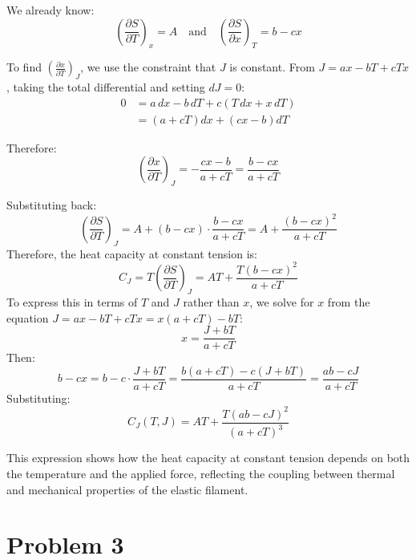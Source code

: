 \documentclass[10pt,twocoloumn]{article}
\begin{document}
We already know:
\begin{equation}\left(\frac{\partial S}{\partial T}\right)_x = A \quad \text{and} \quad \left(\frac{\partial S}{\partial x}\right)_T = b - cx
    \end{equation}

To find $\left(\frac{\partial x}{\partial T}\right)_J$, we use the constraint that $J$ is constant. From $J = ax - bT + cTx$, taking the total differential and setting $dJ = 0$:
\begin{align} 0 &= a\,dx - b\,dT + c(T\,dx + x\,dT) \\
&= (a + cT)dx + (cx - b)dT\end{align}

Therefore:
\begin{equation}
    \left(\frac{\partial x}{\partial T}\right)_J = -\frac{cx - b}{a + cT} = \frac{b - cx}{a + cT}
    \end{equation}

Substituting back:
\begin{equation}
    \left(\frac{\partial S}{\partial T}\right)_J = A + (b - cx) \cdot \frac{b - cx}{a + cT} = A + \frac{(b - cx)^2}{a + cT}
    \end{equation}
Therefore, the heat capacity at constant tension is:
\begin{equation}
    C_J = T\left(\frac{\partial S}{\partial T}\right)_J = AT + \frac{T(b - cx)^2}{a + cT}
    \end{equation}
To express this in terms of $T$ and $J$ rather than $x$, we solve for $x$ from the equation $J = ax - bT + cTx = x(a + cT) - bT$:
\begin{equation}
    x = \frac{J + bT}{a + cT}
    \end{equation}
Then:
\begin{equation}
    b - cx = b - c\cdot\frac{J + bT}{a + cT} = \frac{b(a + cT) - c(J + bT)}{a + cT} = \frac{ab - cJ}{a + cT}
    \end{equation}
Substituting:
\begin{equation}\boxed{C_J(T,J) = AT + \frac{T(ab - cJ)^2}{(a + cT)^3}}\end{equation}

This expression shows how the heat capacity at constant tension depends on both the temperature and the applied force, reflecting the coupling between thermal and mechanical properties of the elastic filament.
\section*{Problem 3}
\end{document}

